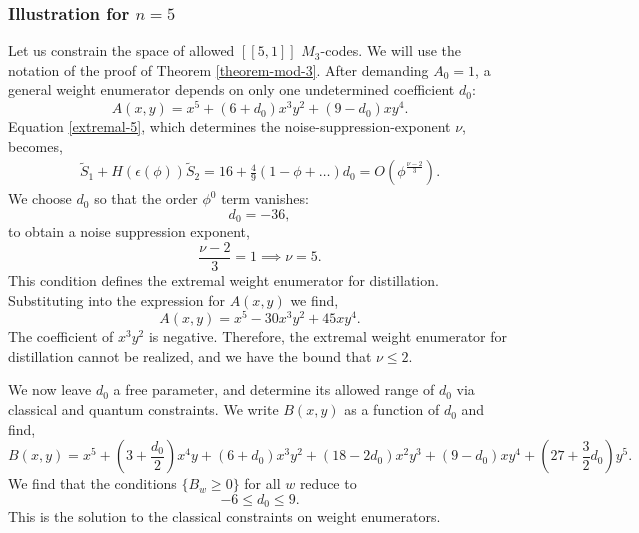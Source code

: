 \documentclass[11pt]{article}
\begin{document}
\subsubsection*{Illustration for $n=5$}
\label{sec:n5}
Let us constrain the space of allowed $[[5,1]]$ $M_3$-codes. We will use the notation of the proof of Theorem \ref{theorem-mod-3}.  
After demanding $A_0=1$, a general weight enumerator depends on only one undetermined coefficient $d_{0}$: 
\begin{equation}
A(x,y)=x^{5}+(6+d_{0})x^3y^2+(9-d_{0})xy^{4}.
\end{equation}
Equation \eqref{extremal-5}, which determines the  noise-suppression-exponent $\nu$, becomes, 
\begin{eqnarray}
    \tilde{S}_1+H(\epsilon(\phi)) \tilde{S}_2 =
    16 + \frac{4}{9}(1-\phi + \ldots) d_0 = O(\phi^{\frac{\nu-2}{3}}). 
\end{eqnarray}
We choose ${d}_{0}$ so that the order $\phi^0$ term vanishes:
\begin{equation}
d_{0}=-36,
\end{equation}
to obtain a noise suppression exponent,
\begin{equation}
\frac{\nu-2}{3}=1 \implies \nu=5.
\end{equation}
This condition defines the extremal weight enumerator for distillation. Substituting into the expression for $A(x,y)$ we find,
\begin{equation}
A(x,y)=x^{5}-30x^{3}y^{2}+45xy^{4}.
\end{equation}
The coefficient of $x^{3}y^{2}$ is negative. Therefore, the extremal weight enumerator for distillation cannot be realized, and we have the bound that $\nu \leq 2$.

We now leave $d_0$ a free parameter, and determine its allowed range of $d_0$ via classical and quantum constraints. We write $B(x,y)$ as a function of $d_{0}$ and find,
\begin{equation}
B(x,y)=x^{5}+\left(3+\frac{d_{0}}{2}\right)x^{4}y+\left(6+d_{0}\right)x^3y^2+\left(18-2d_{0}\right)x^{2}y^{3}+\left(9-d_{0}\right)xy^{4}+\left(27+\frac{3}{2}d_{0}\right)y^{5}.
\end{equation}
We find that the conditions $\{B_w \geq 0\}$ for all $w$ reduce to  
\begin{equation}
-6 \leq d_0 \leq 9.
\label{5-qubit-eqconstraint1}
\end{equation}
This is the solution to the classical constraints on weight enumerators.
\end{document}
